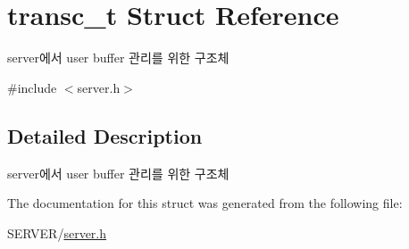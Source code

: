 \hypertarget{structtransc__t}{\section{transc\-\_\-t Struct Reference}
\label{structtransc__t}
}


server에서 user buffer 관리를 위한 구조체  




{\ttfamily \#include $<$server.\-h$>$}



\subsection{Detailed Description}
server에서 user buffer 관리를 위한 구조체 

The documentation for this struct was generated from the following file\-:\begin{DoxyCompactItemize}
\item 
S\-E\-R\-V\-E\-R/\hyperlink{server_8h}{server.\-h}\end{DoxyCompactItemize}
